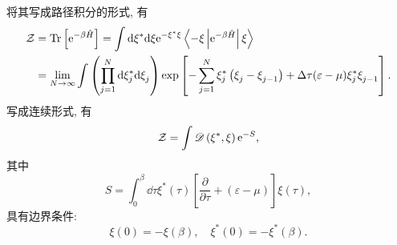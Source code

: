 将其写成路径积分的形式, 有
\begin{align}
\mathcal{Z}&=\operatorname{Tr}\left[\mathrm{e}^{-\beta \hat{H}}\right]=\int \mathrm{d} \xi^{*} \mathrm{d} \xi \mathrm{e}^{-\xi^{*} \xi}\left\langle-\xi\left|\mathrm{e}^{-\beta\hat{H}}\right| \xi\right\rangle\nonumber\\
&=\lim _{N \rightarrow \infty} \int\left(\prod_{j=1}^{N} \mathrm{d} \xi_{j}^{*} \mathrm{d} \xi^{}_{j}\right) \exp \left[-\sum_{j=1}^{N} \xi_{j}^{*}\left(\xi^{}_{j}-\xi^{}_{j-1}\right)+\Delta \tau(\varepsilon-\mu) \xi_{j}^{*} \xi^{}_{j-1}\right].
\end{align}
写成连续形式, 有
\begin{equation}
\mathcal{Z}=\int \mathscr{D}\left(\xi^{*}, \xi\right) \mathrm{e}^{-S} ,
\end{equation}
其中
\begin{equation}
S=\int_{0}^{\beta} \dd \tau \xi^{*}(\tau)\left[\frac{\partial}{\partial \tau}+(\varepsilon-\mu)\right] \xi(\tau) ,
\end{equation}
具有边界条件: 
\begin{equation}
\xi(0)=-\xi(\beta), \quad \xi^{*}(0)=-\xi^{*}(\beta) .
\end{equation} 



